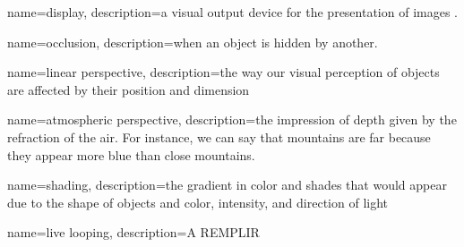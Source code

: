 {
  name=display,
  description={a visual output device for the presentation of images \cite{pimenta2012comprehensive}. }
}

{
	name=occlusion,
	description={when an object is hidden by another.}
}

{
	name={linear perspective},
	description={the way our visual perception of objects are affected by their position and dimension}
}

{
	name={atmospheric perspective},
	description={the impression of depth given by the refraction of the air. For instance, we can say that mountains are far because they appear more blue than close mountains.}
}	

{
	name=shading,
	description={the gradient in color and shades that would appear due to the shape of objects and color, intensity, and direction of light}
}

{
	name={live looping},
	description={A REMPLIR}
}